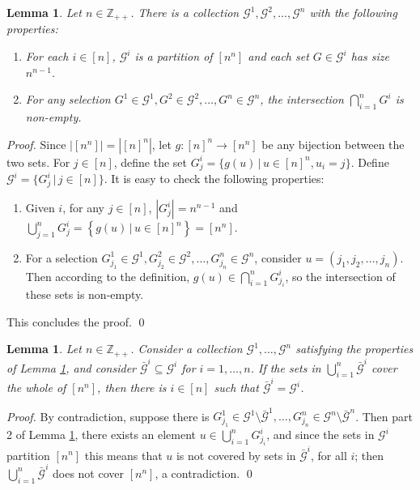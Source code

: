 \documentclass[smallextended]{svjour3}
\newtheorem{lemma}[proposition]{Lemma}
\begin{document}
\begin{lemma}\label{lemma:planesPart}
Let $n \in \mathbb{Z}_{++}$. There is a collection ${\mathcal{G}}^1, {\mathcal{G}}^2, \ldots, {\mathcal{G}}^n$ with the following properties:

\begin{enumerate}
\item For each $i \in [n]$, ${\mathcal{G}}^i$ is a partition of $[n^n]$ and each set $G \in {\mathcal{G}}^i$ has size $n^{n - 1}$.

\item For any selection $G^1 \in {\mathcal{G}}^1, G^2 \in {\mathcal{G}}^2, \ldots, G^n \in {\mathcal{G}}^n$,
the intersection $\bigcap_{i=1}^n G^i$ is non-empty.
\end{enumerate}
\end{lemma}
\begin{proof}
Since $\left|[n^n]\right| = \left|[n]^n\right|$, let $g: [n]^n \rightarrow [n^n]$ be any bijection between the two sets. For $j \in [n]$, define the set $G^i_j  = \{g(u)\,|\,u \in [n]^n, u_i = j\}$. Define ${\mathcal{G}}^i = \{G^i_j \,|\,j\in [n]\}$. It is easy to check the following properties:
\begin{enumerate}
\item Given $i$, for any $j \in [n]$, $\left|G^i_j\right| = n^{n-1}$ and $\bigcup_{j=1}^n G^i_j = \left\{g(u)\,|\,u \in [n]^n \right\} = [n^n]$.
\item For a selection $G^1_{j_1} \in {\mathcal{G}}^1, G^2_{j_2} \in {\mathcal{G}}^2, \ldots, G^n_{j_n} \in {\mathcal{G}}^n$, consider $u = (j_1, j_2, \ldots, j_n)$. Then according to the definition, $g(u) \in \bigcap_{i=1}^n G^i_{j_i}$, so the intersection of these sets is non-empty.
\end{enumerate}
This concludes the proof. {
\ifmp
	\hfill \qed
\fi
}
\end{proof}

\begin{lemma} \label{lemma:coveringCover}
Let $n \in \mathbb{Z}_{++}$. Consider a collection ${\mathcal{G}}^1, \ldots, {\mathcal{G}}^n$ satisfying the properties of Lemma \ref{lemma:planesPart}, and consider $\bar{\mathcal{G}}^i \subseteq {\mathcal{G}}^i$ for $i = 1, \ldots, n$. If the sets in $\bigcup_{i = 1}^n \bar{\mathcal{G}}^i$ cover the whole of $[n^n]$, then there is $i \in [n]$ such that $\bar{\mathcal{G}}^i =
{\mathcal{G}}^i$.
\end{lemma}

\begin{proof}
By contradiction, suppose there is $G^1_{j_1} \in {\mathcal{G}}^1 \setminus
\bar{\mathcal{G}}^1, \ldots, G^n_{j_n} \in {\mathcal{G}}^n \setminus \bar{\mathcal{G}}^n$. Then
part 2 of Lemma \ref{lemma:planesPart}, there exists an element $u \in \bigcup_{i=1}^n G^i_{j_i}$, and since the sets in ${\mathcal{G}}^i$ partition
$[n^n]$ this means that $u$ is not covered by sets in $\bar{\mathcal{G}}^i$,
for all $i$; then $\bigcup_{i =1}^n \bar{\mathcal{G}}^i$ does not cover
$[n^n]$, a contradiction.{
\ifmp
	\hfill \qed
\fi
}
\end{proof}
\end{document}
